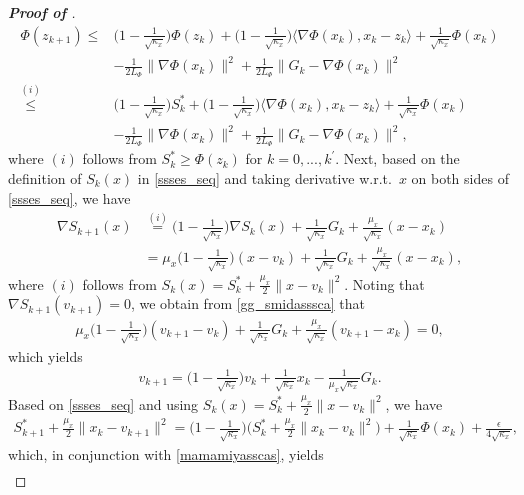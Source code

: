 \documentclass{osudissert96}
\begin{document}
\begin{proof}[{\bf Proof of }]
\begin{align}
 \Phi(z_{k+1})\leq &\Big( 1- \frac{1}{\sqrt{\kappa_x}}\Big) \Phi(z_k) +\Big( 1- \frac{1}{\sqrt{\kappa_x}}\Big) \langle \nabla\Phi(x_k),x_k-z_k\rangle + \frac{1}{\sqrt{\kappa_x}}\Phi(x_k) \nonumber
 \\&-\frac{1}{2L_\Phi}\| \nabla \Phi(x_k)\|^2 +  \frac{1}{2L_\Phi} \|G_k-\nabla \Phi(x_k)\|^2 \nonumber
 \\\overset{(i)}\leq &\Big( 1- \frac{1}{\sqrt{\kappa_x}}\Big) S_k^* +\Big( 1- \frac{1}{\sqrt{\kappa_x}}\Big) \langle \nabla\Phi(x_k),x_k-z_k\rangle + \frac{1}{\sqrt{\kappa_x}}\Phi(x_k) \nonumber
 \\&-\frac{1}{2L_\Phi}\| \nabla \Phi(x_k)\|^2 +  \frac{1}{2L_\Phi} \|G_k-\nabla \Phi(x_k)\|^2,
 \end{align}
 where $(i)$ follows from $S_k^*\geq  \Phi(z_k)$ for $k=0,...,k^\prime$. Next, based on the definition of $S_k(x)$ in \cref{ssses_seq} and taking derivative w.r.t.~$x$ on both sides of  \cref{ssses_seq}, we have 
 \begin{align}\label{gg_smidasssca}
 \nabla S_{k+1}(x) &\overset{(i)}= \Big( 1- \frac{1}{\sqrt{\kappa_x}} \Big)\nabla S_k(x) + \frac{1}{\sqrt{\kappa_x}} G_k +  \frac{\mu_x}{\sqrt{\kappa_x}}(x-x_k) \nonumber
 \\&=\mu_x\Big( 1- \frac{1}{\sqrt{\kappa_x}} \Big)(x-v_k)+\frac{1}{\sqrt{\kappa_x}} G_k +  \frac{\mu_x}{\sqrt{\kappa_x}}(x-x_k), 
 \end{align}
 where $(i)$ follows from $S_k(x) = S_k^* + \frac{\mu_x}{2}\|x-v_k\|^2$. Noting that $\nabla S_{k+1}(v_{k+1})= 0$, we obtain from  \cref{gg_smidasssca} that 
 \begin{align*}
 \mu_x\Big( 1- \frac{1}{\sqrt{\kappa_x}} \Big)(v_{k+1}-v_k)+\frac{1}{\sqrt{\kappa_x}} G_k +  \frac{\mu_x}{\sqrt{\kappa_x}}(v_{k+1}-x_k) = 0,
 \end{align*}
 which yields 
 \begin{align}\label{mamamiyasscas}
 v_{k+1} = \Big(1-\frac{1}{\sqrt{\kappa_x}} \Big)v_k + \frac{1}{\sqrt{\kappa_x}} x_k - \frac{1}{\mu_x\sqrt{\kappa_x}} G_k.
 \end{align}
 Based on \cref{ssses_seq} and using $S_k(x) = S_k^* + \frac{\mu_x}{2}\|x-v_k\|^2$,  we have 
 \begin{align*}
S_{k+1}^*  + \frac{\mu_x}{2}\|x_k-v_{k+1}\|^2 = \Big(1-\frac{1}{\sqrt{\kappa_x}} \Big)\Big(S_{k}^*  + \frac{\mu_x}{2}\|x_k-v_{k}\|^2 \Big) + \frac{1}{\sqrt{\kappa_x}}\Phi(x_k) + \frac{\epsilon}{4\sqrt{\kappa_x}},
 \end{align*}
 which, in conjunction with \cref{mamamiyasscas}, yields
 \begin{align}\label{xingyunwos}

\end{align}
\end{proof}
\end{document}
